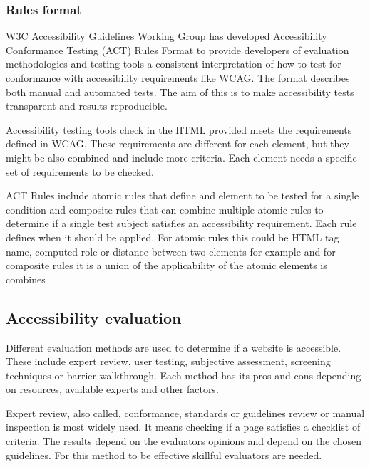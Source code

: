 \documentclass{master_thesis}
\begin{document}
\subsubsection{Rules format}

W3C Accessibility Guidelines Working Group has developed Accessibility Conformance Testing (ACT) Rules Format to provide developers of evaluation methodologies and testing tools a consistent interpretation of how to test for conformance with accessibility requirements like WCAG. The format describes both manual and automated tests. The aim of this is to make accessibility tests transparent and results reproducible. \citep{Fiers2019}

Accessibility testing tools check in the HTML provided meets the requirements defined in WCAG. These requirements are different for each element, but they might be also combined and include more criteria. Each element needs a specific set of requirements to be checked.

ACT Rules include atomic rules that define and element to be tested for a single condition and composite rules that can combine multiple atomic rules to determine if a single test subject satisfies an accessibility requirement. Each rule defines when it should be applied. For atomic rules this could be HTML tag name, computed role or distance between two elements for example and for composite rules it is a union of the applicability of the atomic elements is combines  \citep{Fiers2019}

\subsection{Accessibility evaluation}


Different evaluation methods are used to determine if a website is accessible. These include expert review, user testing, subjective assessment, screening techniques or barrier walkthrough. Each method has its pros and cons depending on resources, available experts and other factors.

Expert review, also called, conformance, standards or guidelines review or manual inspection is most widely used. It means checking if a page satisfies a checklist of criteria. The results depend on the evaluators opinions and depend on the chosen guidelines. For this method to be effective skillful evaluators are needed. \citep{Brajnik2008}
\end{document}
